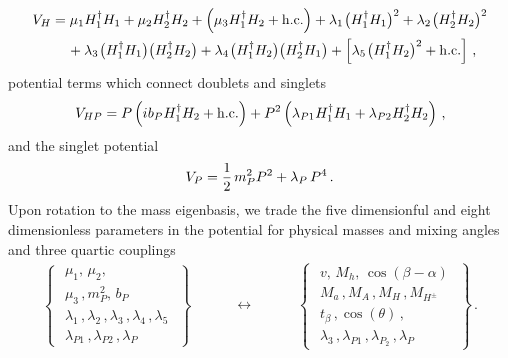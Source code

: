 \documentclass[12pt]{article}
\renewcommand\({\left(}
\renewcommand\){\right)}
\renewcommand\[{\left[}
\renewcommand\]{\right]}
\begin{document}
\begin{align}\label{eq:VH}
V_{H} & = \mu_1 H_1^\dagger H_1 + \mu_2 H_2^\dagger H_2 + \left ( \mu_3  H_1^\dagger H_2 + {\rm h.c.} \right ) + \lambda_1  \hspace{0.25mm} \big ( H_1^\dagger H_1  \big )^2  + \lambda_2  \hspace{0.25mm} \big ( H_2^\dagger H_2 \big  )^2 \notag \\
& \phantom{xx} +  \lambda_3 \hspace{0.25mm} \big ( H_1^\dagger H_1  \big ) \big ( H_2^\dagger H_2  \big ) + \lambda_4  \hspace{0.25mm} \big ( H_1^\dagger H_2  \big ) \big ( H_2^\dagger H_1  \big ) + \left [ \lambda_5   \hspace{0.25mm} \big ( H_1^\dagger H_2 \big )^2 + {\rm h.c.} \right ]  \,,
\end{align}
potential terms which connect doublets and singlets 
\begin{equation} \label{eq:VHP}
\begin{split}
V_{HP}  = P \left ( i \hspace{0.1mm} b_P  \hspace{0.1mm}  H_1^\dagger H_2 + {\rm h.c.} \right ) + P^2 \left (  \lambda_{P1}  \hspace{0.1mm}  H_1^\dagger H_1 +   \lambda_{P2}  \hspace{0.1mm}  H_2^\dagger H_2 \right )  \,,
\end{split} 
\end{equation}
and the singlet potential
\begin{equation} \label{eq:VP}
V_{P}  =  \frac{1}{2} \hspace{0.5mm} m_P^2  P^2 +  \lambda_P\,P^4 \,.
\end{equation}
Upon rotation to the mass eigenbasis, we trade the five dimensionful and eight dimensionless parameters in the potential  for physical masses and mixing angles and three quartic couplings
\begin{align}
\left\{ \,\,\begin{matrix}
\mu_1,\,\mu_2,\\[3pt]
\mu_3\,, m_P^2,\, b_P\\[3pt]
\lambda_1\,,\lambda_2\,,\lambda_3\,,\lambda_4\,,\lambda_5\\
\lambda_{P1}\,,\lambda_{P2} \,, \lambda_P
\end{matrix}\,\,\right\}\qquad \quad \longleftrightarrow \quad \qquad \left\{ \,\,\begin{matrix}
v,\, M_h,\,\cos(\beta-\alpha)\\[3pt]
M_a\,, M_A\,, M_H\,,M_{H^\pm}\\[3pt]
t_\beta\,, \cos(\theta)\,, \\[3pt]
\lambda_3\,,\lambda_{P1}\,,\lambda_{P_2}\,,\lambda_P
\end{matrix}\,\,\right\}\,.
\end{align}
\end{document}
